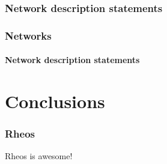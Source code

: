 \documentclass[10pt]{beamer}
\begin{document}
\subsubsection*{Network description statements}
\begin{frame}
\frametitle{Networks}
\framesubtitle{Network description statements}
\end{frame}


\section{Conclusions}
\begin{frame}
  \frametitle{Rheos}
  Rheos is awesome!
\end{frame}
\end{document}
